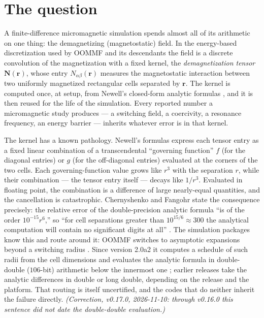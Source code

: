 \documentclass[11pt]{amsart}
\theoremstyle{plain}
\theoremstyle{definition}
\theoremstyle{remark}
\begin{document}
\section{The question}

A finite-difference micromagnetic simulation spends almost all of its arithmetic
on one thing: the demagnetizing (magnetostatic) field. In the energy-based
discretization used by OOMMF and its descendants the field is a discrete
convolution of the magnetization with a fixed kernel, the \emph{demagnetization
tensor} $\mathbf N(\mathbf r)$, whose entry $N_{\alpha\beta}(\mathbf r)$
measures the magnetostatic interaction between two uniformly magnetized
rectangular cells separated by $\mathbf r$. The kernel is computed once, at
setup, from Newell's closed-form analytic formulas \cite{Newell1993}, and it is
then reused for the life of the simulation. Every reported number a
micromagnetic study produces --- a switching field, a coercivity, a resonance
frequency, an energy barrier --- inherits whatever error is in that kernel.

The kernel has a known pathology. Newell's formulas express each tensor entry as
a fixed linear combination of a transcendental ``governing function'' $f$ (for
the diagonal entries) or $g$ (for the off-diagonal entries) evaluated at the
corners of the two cells. Each governing-function value grows like $r^{3}$ with
the separation $r$, while their combination --- the tensor entry itself --- decays
like $1/r^{3}$. Evaluated in floating point, the combination is a difference of
large nearly-equal quantities, and the cancellation is catastrophic.
Chernyshenko and Fangohr state the consequence precisely: the relative error of
the double-precision analytic formula ``is of the order $10^{-15}r^{6}$,'' so
``for cell separations greater than $10^{15/6}\approx 300$ the analytical
computation will contain no significant digits at all'' \cite[\S II.B]{CF2015}.
The simulation packages know this and route around it: OOMMF switches to
asymptotic expansions beyond a switching radius \cite{CF2015}. Since version
2.0a2 it computes a schedule of such radii from the cell dimensions and evaluates
the analytic formula in double-double ($106$-bit) arithmetic below the innermost
one \cite{OOMMF}; earlier releases take the analytic differences in double or
long double, depending on the release and the platform. That routing is itself
uncertified, and the codes that do neither inherit the failure directly.
\emph{(Correction, v0.17.0, 2026-11-10: through v0.16.0 this sentence did not
date the double-double evaluation.)}
\end{document}

